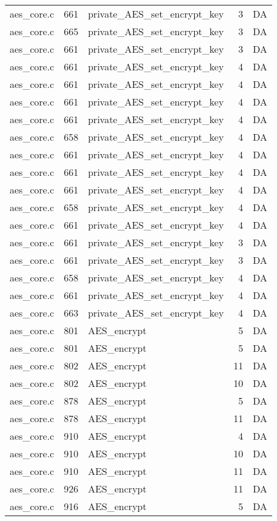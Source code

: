 \begin{table}
\begin{tabular}{lrlrr}
aes\_core.c& 661&private\_AES\_set\_encrypt\_key&3 &DA\\
aes\_core.c& 665&private\_AES\_set\_encrypt\_key&3 &DA\\
aes\_core.c& 661&private\_AES\_set\_encrypt\_key&3 &DA\\
aes\_core.c& 661&private\_AES\_set\_encrypt\_key&4 &DA\\
aes\_core.c& 661&private\_AES\_set\_encrypt\_key&4 &DA\\
aes\_core.c& 661&private\_AES\_set\_encrypt\_key&4 &DA\\
aes\_core.c& 661&private\_AES\_set\_encrypt\_key&4 &DA\\
aes\_core.c& 658&private\_AES\_set\_encrypt\_key&4 &DA\\
aes\_core.c& 661&private\_AES\_set\_encrypt\_key&4 &DA\\
aes\_core.c& 661&private\_AES\_set\_encrypt\_key&4 &DA\\
aes\_core.c& 661&private\_AES\_set\_encrypt\_key&4 &DA\\
aes\_core.c& 658&private\_AES\_set\_encrypt\_key&4 &DA\\
aes\_core.c& 661&private\_AES\_set\_encrypt\_key&4 &DA\\
aes\_core.c& 661&private\_AES\_set\_encrypt\_key&3 &DA\\
aes\_core.c& 661&private\_AES\_set\_encrypt\_key&3 &DA\\
aes\_core.c& 658&private\_AES\_set\_encrypt\_key&4 &DA\\
aes\_core.c& 661&private\_AES\_set\_encrypt\_key&4 &DA\\
aes\_core.c& 663&private\_AES\_set\_encrypt\_key&4 &DA\\
aes\_core.c& 801&AES\_encrypt&5 &DA\\
aes\_core.c& 801&AES\_encrypt&5 &DA\\
aes\_core.c& 802&AES\_encrypt&11&DA\\
aes\_core.c& 802&AES\_encrypt&10&DA\\
aes\_core.c& 878&AES\_encrypt&5 &DA\\
aes\_core.c& 878&AES\_encrypt&11&DA\\
aes\_core.c& 910&AES\_encrypt&4 &DA\\
aes\_core.c& 910&AES\_encrypt&10&DA\\
aes\_core.c& 910&AES\_encrypt&11&DA\\
aes\_core.c& 926&AES\_encrypt&11&DA\\
aes\_core.c& 916&AES\_encrypt&5 &DA\\

\end{tabular}
\end{table}
